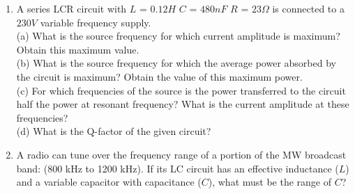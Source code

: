 \begin{enumerate}[label=\thesection.\arabic*,ref=\thesection.\theenumi]
\item A series LCR circuit with 
$L$ = $0.12 H$
$C$ = $480 nF$
$R$ = $23 \Omega$
is connected to a $230 V$ variable frequency supply.\\
(a) What is the source frequency for which current amplitude is maximum? Obtain this maximum value.\\
(b) What is the source frequency for which the average power absorbed by the circuit is maximum? Obtain the value of this maximum power.\\
(c) For which frequencies of the source is the power transferred to the circuit half the power at resonant frequency? What is the current amplitude at these frequencies?\\
(d) What is the Q-factor of the given circuit?\\
\solution
\pagebreak
\item A radio can tune over the frequency range of a portion of the MW broadcast band: (800 kHz to 1200 kHz). If its LC circuit has an effective inductance (\(L\)) and a variable capacitor with capacitance (\(C\)), what must be the range of \(C\)?\\
\solution
\pagebreak
\end{enumerate}
